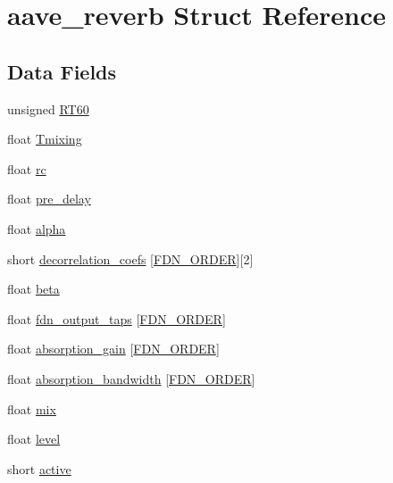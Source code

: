 \hypertarget{structaave__reverb}{\section{aave\-\_\-reverb Struct Reference}
\label{structaave__reverb}
}
\subsection*{Data Fields}
\begin{DoxyCompactItemize}
\item 
unsigned \hyperlink{structaave__reverb_a61f593c67c5e0ac18c2255c3c0830bc1}{R\-T60}
\item 
float \hyperlink{structaave__reverb_aa650231c06910bb5e352682b1bd6bd19}{Tmixing}
\item 
float \hyperlink{structaave__reverb_a2bc62b21b9ba27d56575f7ddbf23ff89}{rc}
\item 
float \hyperlink{structaave__reverb_a338401b5113dcb382637d43dba5f4aa5}{pre\-\_\-delay}
\item 
float \hyperlink{structaave__reverb_a797c24d78e79d4a3bfec25e5a625dc46}{alpha}
\item 
short \hyperlink{structaave__reverb_a2e40ddc7cc824ddf535c1e80fb1145d5}{decorrelation\-\_\-coefs} \mbox{[}\hyperlink{aave_8h_aa8ac0978ba9be33dd450abaaa2dda4d9}{F\-D\-N\-\_\-\-O\-R\-D\-E\-R}\mbox{]}\mbox{[}2\mbox{]}
\item 
float \hyperlink{structaave__reverb_a7df2091982d7d299e1c657c015696bc7}{beta}
\item 
float \hyperlink{structaave__reverb_a1236e5a13384cac788a3f255cf0b9628}{fdn\-\_\-output\-\_\-taps} \mbox{[}\hyperlink{aave_8h_aa8ac0978ba9be33dd450abaaa2dda4d9}{F\-D\-N\-\_\-\-O\-R\-D\-E\-R}\mbox{]}
\item 
float \hyperlink{structaave__reverb_a6f410c8899e7f65ae336f974939fb9f4}{absorption\-\_\-gain} \mbox{[}\hyperlink{aave_8h_aa8ac0978ba9be33dd450abaaa2dda4d9}{F\-D\-N\-\_\-\-O\-R\-D\-E\-R}\mbox{]}
\item 
float \hyperlink{structaave__reverb_ab0c29338df0fe247476f5afed0c78dd8}{absorption\-\_\-bandwidth} \mbox{[}\hyperlink{aave_8h_aa8ac0978ba9be33dd450abaaa2dda4d9}{F\-D\-N\-\_\-\-O\-R\-D\-E\-R}\mbox{]}
\item 
float \hyperlink{structaave__reverb_a1d02d0947a2ba910470d895e03e210d4}{mix}
\item 
float \hyperlink{structaave__reverb_a7d35fe8d4163e93cf8a54779151a17bf}{level}
\item 
short \hyperlink{structaave__reverb_a117b8425b9574ffd1d6cde92bc0a6de0}{active}
\end{DoxyCompactItemize}



